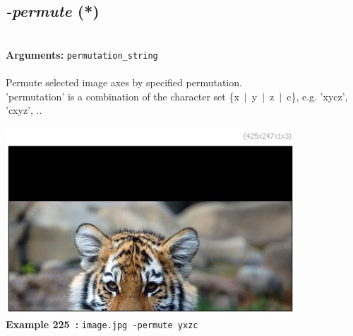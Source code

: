 \documentclass[a4paper,11pt,twoside]{book}
\begin{document}
\subsection{\emph{-permute} (*)}\vspace*{-0.5em}
~\\\textbf{Arguments: } 
{\small \texttt{permutation\_string}}\\~\\
Permute selected image axes by specified permutation.
~\\'permutation' is a combination of the character set \{x~$|$~y~$|$~z~$|$~c\},
e.g. 'xycz', 'cxyz', ..
\begin{center}\includegraphics[keepaspectratio=true,height=7cm,width=\textwidth]{img/gmic_def225.jpg}\\
{\footnotesize \textbf{Example 225~:} \texttt{image.jpg -permute yxzc}}
\end{center}
\end{document}
